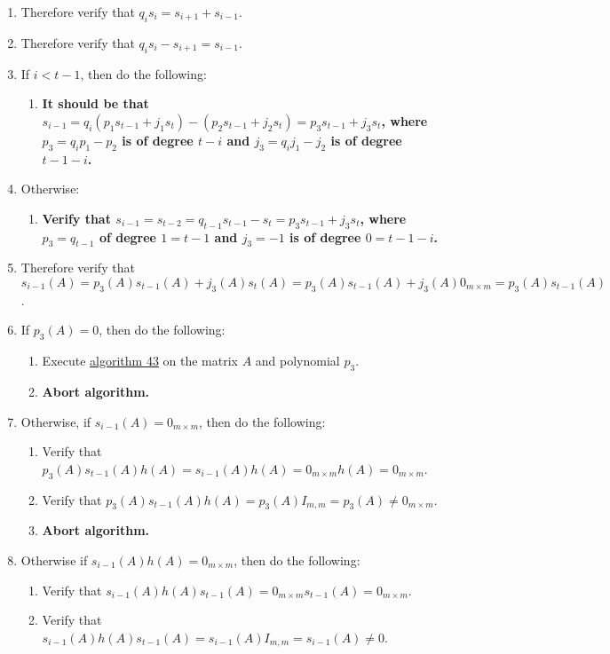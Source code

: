 \documentclass[twocolumn]{article}
\begin{document}
\begin{enumerate}
\begin{enumerate}
					\item Therefore verify that $q_is_i=s_{i+1}+s_{i-1}$.
					\item Therefore verify that $q_is_i-s_{i+1}=s_{i-1}$.
					\item If $i<t-1$, then do the following:
					\begin{enumerate}
						\item \textbf{It should be that $s_{i-1}=q_i(p_1s_{t-1}+j_1s_t)-(p_2s_{t-1}+j_2s_t)=p_3s_{t-1}+j_3s_t$, where $p_3=q_ip_1-p_2$ is of degree $t-i$ and $j_3=q_ij_1-j_2$ is of degree $t-1-i$.}
					\end{enumerate}
					\item Otherwise:
					\begin{enumerate}
						\item \textbf{Verify that $s_{i-1}=s_{t-2}=q_{t-1}s_{t-1}-s_t=p_3s_{t-1}+j_3s_t$, where $p_3=q_{t-1}$ of degree $1=t-1$ and $j_3=-1$ is of degree $0=t-1-i$.}
					\end{enumerate}
					\item Therefore verify that $s_{i-1}(A)=p_3(A)s_{t-1}(A)+j_3(A)s_t(A)=p_3(A)s_{t-1}(A)+j_3(A)0_{m\times m}=p_3(A)s_{t-1}(A)$.
					\item If $p_3(A)=0$, then do the following:
					\begin{enumerate}
						\item Execute \hyperref[sec:algorithm 43]{algorithm 43} on the matrix $A$ and polynomial $p_3$.
						\item \textbf{Abort algorithm.}
					\end{enumerate}
					\item Otherwise, if $s_{i-1}(A)=0_{m\times m}$, then do the following:
					\begin{enumerate}
						\item Verify that $p_3(A)s_{t-1}(A)h(A)=s_{i-1}(A)h(A)=0_{m\times m}h(A)=0_{m\times m}$.
						\item Verify that $p_3(A)s_{t-1}(A)h(A)=p_3(A)I_{m,m}=p_3(A)\ne0_{m\times m}$.
						\item \textbf{Abort algorithm.}
					\end{enumerate}
					\item Otherwise if $s_{i-1}(A)h(A)=0_{m\times m}$, then do the following:
					\begin{enumerate}
						\item Verify that $s_{i-1}(A)h(A)s_{t-1}(A)=0_{m\times m}s_{t-1}(A)=0_{m\times m}$.
						\item Verify that $s_{i-1}(A)h(A)s_{t-1}(A)=s_{i-1}(A)I_{m,m}=s_{i-1}(A)\ne 0$.

\end{enumerate}
\end{enumerate}
\end{enumerate}
\end{document}
